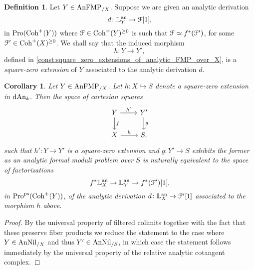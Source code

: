 \documentclass[10pt,a4paper,reqno]{amsart} %
\theoremstyle{plain}
\newtheorem{cor}[thm]{Corollary}
\theoremstyle{definition}
\newtheorem{defin}[thm]{Definition}
\theoremstyle{remark}
\numberwithin{equation}{section}
\begin{document}
\begin{defin}
    Let $Y \in \mathrm{AnFMP}_{/X}$. Suppose we are given an analytic derivation
        \[
            d \colon \mathbb L^\mathrm{an}_Y \to \mathcal F [1],  
        \]
    in $\mathrm{Pro}(\mathrm{Coh}^+(Y))$ where $\mathcal F \in \mathrm{Coh}^+(Y)^{\ge 0}$ is such that $\mathcal F \simeq f^*(\mathcal F')$, for some $\mathcal F' \in \mathrm{Coh}^+(X)^{\ge 0}$. We shall
    say that the induced morphism
        \[
            h \colon Y \to Y',  
        \] 
    defined in \cref{const:square_zero_extensions_of_analytic_FMP_over_X}, is a \emph{square-zero extension} of $Y$
    associated to the analytic derivation $d$. 
\end{defin}

\begin{cor} \label{cor:construction_of_square_zero_extensions_for_analytic_FMP_using_univ_property_of_cotangent_complex}
    Let $Y \in \mathrm{AnFMP}_{/X}$. Let $h \colon X \hookrightarrow S$ denote a square-zero extension in $\mathrm{dAn}_k$.
    Then the space of cartesian squares
        \[
        \begin{tikzcd}
            Y \ar{r}{h'} \ar{d}{f} & Y' \ar{d}{g} \\
            X \ar{r}{h} & S,
        \end{tikzcd}
        \]
    such that $h' \colon Y \to Y'$ is a square-zero extension and $g \colon Y' \to S$ exhibits the former
    as an analytic formal moduli problem over $S$ is naturally equivalent to the space of factorizations
        \[
            f^* \mathbb L^\mathrm{an}_X \to \mathbb L^\mathrm{an}_Y \to f^*( \mathcal F')[1],
        \]
    in $\mathrm{Pro}^\mathrm{ps}(\mathrm{Coh}^+(Y))$, of the analytic derivation $d \colon \mathbb L^\mathrm{an}_X \to \mathcal F'[1]$ associated to the morphism $h$ above.
\end{cor}

\begin{proof}
    By the universal property of filtered colimits together with the fact that these preserve fiber products we reduce the statement to the case where $Y \in \mathrm{AnNil}_{/X}$ and thus $Y' \in \mathrm{AnNil}_{/S}$, in which
    case the statement follows immediately by the universal property of the relative analytic cotangent complex.
\end{proof}
\end{document}
